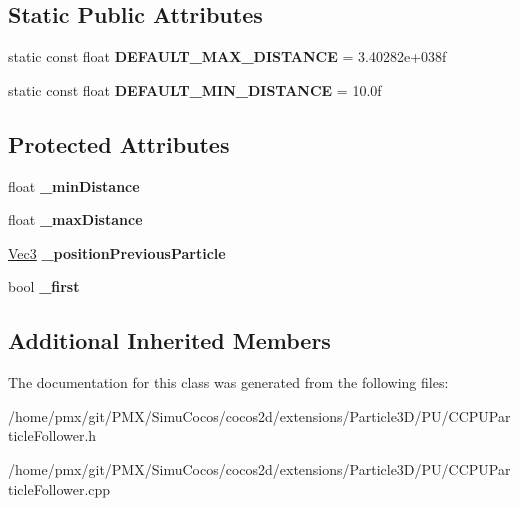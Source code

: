 \subsection*{Static Public Attributes}
\begin{DoxyCompactItemize}
\item 
\mbox{\label{classPUParticleFollower_a39edbc90f1f6f2d41e6f1f6e3df315b6}} 
static const float {\bfseries D\+E\+F\+A\+U\+L\+T\+\_\+\+M\+A\+X\+\_\+\+D\+I\+S\+T\+A\+N\+CE} = 3.\+40282e+038f
\item 
\mbox{\label{classPUParticleFollower_a7910088df15360c89f1bae6a5d99f5f3}} 
static const float {\bfseries D\+E\+F\+A\+U\+L\+T\+\_\+\+M\+I\+N\+\_\+\+D\+I\+S\+T\+A\+N\+CE} = 10.\+0f
\end{DoxyCompactItemize}
\subsection*{Protected Attributes}
\begin{DoxyCompactItemize}
\item 
\mbox{\label{classPUParticleFollower_a6862e3e17da539554d7a2047cc49dc37}} 
float {\bfseries \+\_\+min\+Distance}
\item 
\mbox{\label{classPUParticleFollower_a51f8a472040a0434c6294ac7fa97a228}} 
float {\bfseries \+\_\+max\+Distance}
\item 
\mbox{\label{classPUParticleFollower_af2c837c807f849c105c9acba2652d954}} 
\hyperlink{classVec3}{Vec3} {\bfseries \+\_\+position\+Previous\+Particle}
\item 
\mbox{\label{classPUParticleFollower_a2bae7d4aea2a06241c217b4fad92c997}} 
bool {\bfseries \+\_\+first}
\end{DoxyCompactItemize}
\subsection*{Additional Inherited Members}


The documentation for this class was generated from the following files\+:\begin{DoxyCompactItemize}
\item 
/home/pmx/git/\+P\+M\+X/\+Simu\+Cocos/cocos2d/extensions/\+Particle3\+D/\+P\+U/C\+C\+P\+U\+Particle\+Follower.\+h\item 
/home/pmx/git/\+P\+M\+X/\+Simu\+Cocos/cocos2d/extensions/\+Particle3\+D/\+P\+U/C\+C\+P\+U\+Particle\+Follower.\+cpp\end{DoxyCompactItemize}
